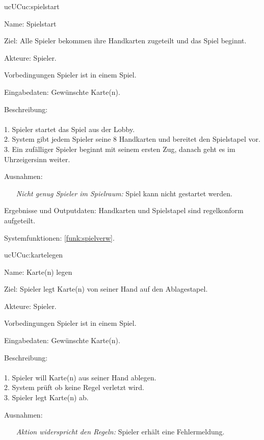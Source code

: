\begin{description}[leftmargin=5em, style=sameline]
        \begin{lhp}{uc}{UC}{uc:spielstart}
    	\item [Name:] Spielstart
    	\item [Ziel:] Alle Spieler bekommen ihre Handkarten zugeteilt und das Spiel beginnt.
    	\item [Akteure:] Spieler.
    	\item [Vorbedingungen] Spieler ist in einem Spiel. 
      	\item [Eingabedaten:] Gewünschte Karte(n).
    	\item [Beschreibung:] \hfill\\ \hfill\\
    	1. Spieler startet das Spiel aus der Lobby.\\
    	2. System gibt jedem Spieler seine 8 Handkarten und bereitet den Spielstapel vor.\\
    	3. Ein zufälliger Spieler beginnt mit seinem ersten Zug, danach geht es im Uhrzeigersinn weiter.\\
    	\item [Ausnahmen:] \hfill
    	\begin{itemize} 
				\item[] \textit{Nicht genug Spieler im Spielraum:} Spiel kann nicht gestartet werden.
				
			\end{itemize} 
    	\item [Ergebnisse und Outputdaten:] Handkarten und Spielstapel sind regelkonform aufgeteilt.
    	\item [Systemfunktionen:] \ref{funk:spielverw}.
    \end{lhp}
    
    \begin{lhp}{uc}{UC}{uc:kartelegen}
    	\item [Name:] Karte(n) legen
    	\item [Ziel:] Spieler legt Karte(n) von seiner Hand auf den Ablagestapel.
    	\item [Akteure:] Spieler.
    	\item [Vorbedingungen] Spieler ist in einem Spiel. 
      	\item [Eingabedaten:] Gewünschte Karte(n).
    	\item [Beschreibung:] \hfill\\ \hfill\\
    	1. Spieler will Karte(n) aus seiner Hand ablegen.\\
    	2. System prüft ob keine Regel verletzt wird.\\
    	3. Spieler legt Karte(n) ab.\\
    	\item [Ausnahmen:] \hfill
    	\begin{itemize} 
				\item[] \textit{Aktion widerspricht den Regeln:} Spieler erhält eine Fehlermeldung.
				

\end{itemize}
\end{lhp}
\end{description}
